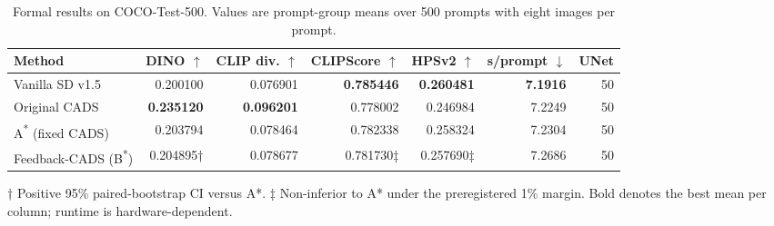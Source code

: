 \begin{table}[t]
\centering
\caption{Formal results on COCO-Test-500. Values are prompt-group means over 500 prompts with eight images per prompt.}
\label{tab:formal-results}
\small
\begin{tabular}{lrrrrrr}
\toprule
Method & DINO $\uparrow$ & CLIP div. $\uparrow$ & CLIPScore $\uparrow$ & HPSv2 $\uparrow$ & s/prompt $\downarrow$ & UNet \\
\midrule
Vanilla SD v1.5 & 0.200100 & 0.076901 & \textbf{0.785446} & \textbf{0.260481} & \textbf{7.1916} & 50 \\
Original CADS & \textbf{0.235120} & \textbf{0.096201} & 0.778002 & 0.246984 & 7.2249 & 50 \\
A\textsuperscript{*} (fixed CADS) & 0.203794 & 0.078464 & 0.782338 & 0.258324 & 7.2304 & 50 \\
Feedback-CADS (B\textsuperscript{*}) & 0.204895† & 0.078677 & 0.781730‡ & 0.257690‡ & 7.2686 & 50 \\
\bottomrule
\end{tabular}
\begin{minipage}{0.99\linewidth}
\footnotesize † Positive 95\% paired-bootstrap CI versus A*. ‡ Non-inferior to A* under the preregistered 1\% margin. Bold denotes the best mean per column; runtime is hardware-dependent.
\end{minipage}
\end{table}
